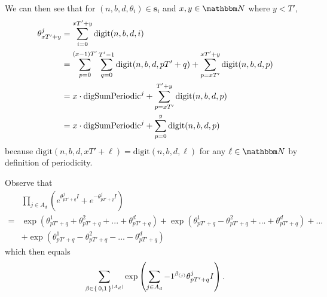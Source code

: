\documentclass[11pt,titlepage]{article}
\newcommand{\rationalPeriod}{{T^j}'}
\newcommand{\rationalPeriodTotal}{{T}'}
\newcommand{\seedAngleJ}[2]{{\theta^{#2}_{#1}}}
\newcommand{\seedAngle}[1]{{\theta^j_{#1}}}
\newcommand{\totalPeriod}{T}
\newcommand{\digSumPeriodic}{\mathrm{digSumPeriodic}^j}
\begin{document}
\newcommand{\periodFrac}{\frac{\totalPeriod}{\rationalPeriod}}
\newcommand{\periodFracRational}{\frac{\rationalPeriodTotal}{\rationalPeriod}}

We can then see that for $(n, b, d, \theta_i) \in \pmb{s}_i$ and $x, y \in \N$ where $y < \rationalPeriodTotal$,
\begin{align}
  \seedAngle{x \rationalPeriodTotal + y} &= \sum_{i = 0}^{x \rationalPeriodTotal + y} \mathrm{digit}(n, b, d, i) \notag \\
  &= \sum_{p = 0}^{(x- 1)\rationalPeriodTotal} \sum_{q=0}^{\rationalPeriodTotal - 1} \mathrm{digit}(n, b, d, p\rationalPeriodTotal + q)
    + \sum_{p = x \rationalPeriodTotal}^{x \rationalPeriodTotal + y} \mathrm{digit}(n, b, d, p) \notag \\
  \label{eq:angleBreakdown}
  &= x \cdot \digSumPeriodic + \sum_{p = x \rationalPeriodTotal}^{\rationalPeriodTotal + y}\mathrm{digit}(n, b, d, p) \notag \\
  &= x \cdot \digSumPeriodic + \sum_{p = 0}^{y}\mathrm{digit}(n, b, d, p)
\end{align}
because $\mathrm{digit}(n, b, d, x\rationalPeriodTotal + \ell) = \mathrm{digit}(n, b, d, \ell)$ for any $\ell \in \N$
by definition of periodicity.


Observe that 
\begin{align*}
 &\prod_{j \in A_d} \left(e^{\seedAngle{p \rationalPeriodTotal + q} I} +  e^{-\seedAngle{p \rationalPeriodTotal + q} I}\right) \\
 =& \exp(\seedAngleJ{p \rationalPeriodTotal + q}{1} + \seedAngleJ{p \rationalPeriodTotal + q}{2} + ... + \seedAngleJ{p \rationalPeriodTotal + q}{d}) 
  + \exp(\seedAngleJ{p \rationalPeriodTotal + q}{1} - \seedAngleJ{p \rationalPeriodTotal + q}{2} + ... + \seedAngleJ{p \rationalPeriodTotal + q}{d}) + ... \\
  &+ \exp(\seedAngleJ{p \rationalPeriodTotal + q}{1} - \seedAngleJ{p \rationalPeriodTotal + q}{2} - ... - \seedAngleJ{p \rationalPeriodTotal + q}{d})
\end{align*}
which then equals
\begin{equation}
 \sum_{\beta \in \set{0,1}^{|A_d|}} 
    \exp\left(
        \sum_{j \in A_d} -1 ^ {\beta_{(j)}}
        \seedAngle{p \rationalPeriodTotal + q}I
      \right).
\end{equation}
\end{document}
